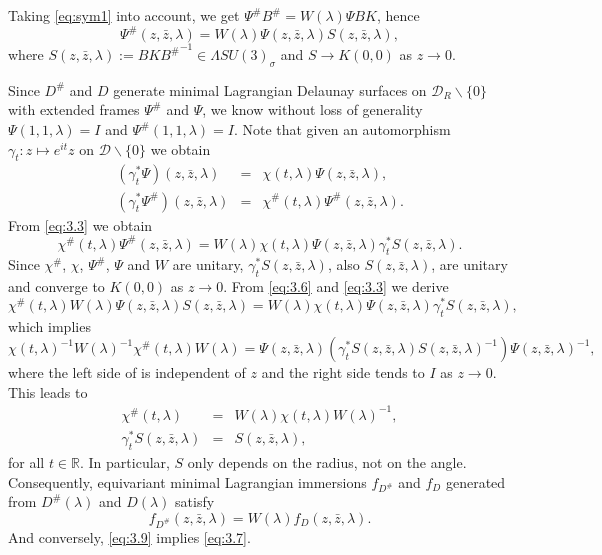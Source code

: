 \documentclass[a4paper,11pt]{amsart}
\theoremstyle{definition}
\numberwithin{equation}{section}
\begin{document}
 Taking \eqref{eq:sym1} into account, we get  
 $\Psi^{\#} B^{\#}=W(\lambda)\Psi B K$, hence 
 \begin{equation}\label{eq:3.3}
 \Psi^{\#}(z,\bar{z},\lambda)=W(\lambda) \Psi(z,\bar{z},\lambda) S(z,\bar{z},\lambda),
 \end{equation}
 where $S(z,\bar{z},\lambda):=BK{B^{\#}}^{-1} \in \Lambda SU(3)_{\sigma}$ and $S\rightarrow K(0,0)$ as $z\rightarrow 0$. 

Since $D^{\#}$ and $D$ generate  minimal Lagrangian Delaunay surfaces on $\mathcal{D}_R\backslash\{0\}$ with extended frames $\Psi^{\#}$ and $\Psi$, we  know without loss of generality $\Psi(1,1,\lambda)=I$ and 
$\Psi^{\#}(1,1,\lambda)=I$. 
Note that given an automorphism $\gamma_t: z\mapsto e^{it}z$ on $\mathcal{D}\backslash\{0\}$ we obtain
\begin{eqnarray}
(\gamma_t^*\Psi)(z,\bar{z},\lambda)&=&\chi(t,\lambda) \Psi(z,\bar{z},\lambda),\\
(\gamma_t^*\Psi^{\#})(z,\bar{z},\lambda)&=&\chi^{\#}(t,\lambda) \Psi^{\#}(z,\bar{z},\lambda).
\end{eqnarray}
From \eqref{eq:3.3} we obtain
\begin{equation}\label{eq:3.6}
\chi^{\#}(t,\lambda)\Psi^{\#}(z,\bar{z},\lambda)=W(\lambda)\chi(t,\lambda)\Psi(z,\bar{z},\lambda)\gamma_t^*S(z,\bar{z},\lambda).
\end{equation}
Since $\chi^{\#}$, $\chi$, $\Psi^{\#}$, $\Psi$ and $W$ are unitary, $\gamma_t^* S(z,\bar{z},\lambda)$, also $S(z,\bar{z},\lambda)$, are unitary and converge to $K(0,0)$ as $z\rightarrow 0$.
From \eqref{eq:3.6} and \eqref{eq:3.3} we derive
$$\chi^{\#}(t,\lambda)W(\lambda)\Psi(z,\bar{z},\lambda) S(z,\bar{z},\lambda)=W(\lambda)\chi(t,\lambda)\Psi(z,\bar{z},\lambda)\gamma_t^*S(z,\bar{z},\lambda),$$
which implies
$${\chi(t,\lambda)}^{-1} {W(\lambda)}^{-1}\chi^{\#}(t,\lambda)W(\lambda)=
\Psi(z,\bar{z},\lambda)(\gamma_t^*S(z,\bar{z},\lambda)  S(z,\bar{z},\lambda)^{-1})\Psi(z,\bar{z},\lambda)^{-1},$$
where the left side of  is independent of $z$ and the right side tends to $I$ as $z\rightarrow 0$. 
This leads to
\begin{eqnarray}
\chi^{\#}(t,\lambda)&=&W(\lambda)\chi(t,\lambda)W(\lambda)^{-1},\label{eq:3.7}\\
\gamma_t^*S(z,\bar{z},\lambda)&=&S(z,\bar{z},\lambda),
\end{eqnarray}
for all $t\in \mathbb{R}$.
In particular, $S$ only depends on the radius, not on the angle. 
Consequently, equivariant minimal Lagrangian immersions $f_{D^{\#}}$ and $f_{D}$ generated from $D^{\#}(\lambda)$ and $D(\lambda)$ satisfy
\begin{equation}\label{eq:3.9}
f_{D^{\#}}(z,\bar{z},\lambda)=W(\lambda) f_{D}(z,\bar{z},\lambda).
\end{equation}
And conversely, \eqref{eq:3.9} implies \eqref{eq:3.7}.
\end{document}
